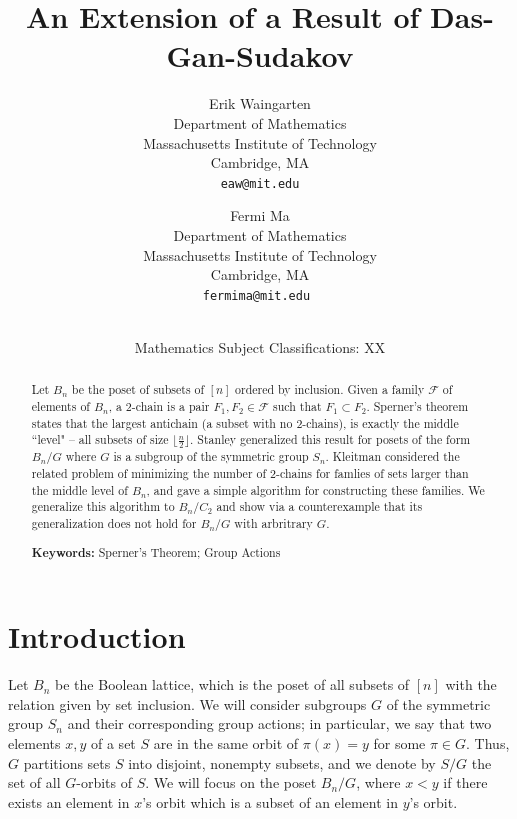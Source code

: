 \documentclass[12pt]{article}
\title{\bf An Extension of a Result of Das-Gan-Sudakov}
\author{Erik Waingarten\\
\small Department of Mathematics\\[-0.8ex]
\small Massachusetts Institute of Technology\\[-0.8ex] 
\small Cambridge, MA\\
\small\tt eaw@mit.edu\\
\and
Fermi Ma\\
\small Department of Mathematics\\[-0.8ex]
\small Massachusetts Institute of Technology\\[-0.8ex]
\small Cambridge, MA\\
\small\tt fermima@mit.edu
}
\date{\dateline{August, 2014}{XX}\\
\small Mathematics Subject Classifications: XX}
\theoremstyle{plain}
\theoremstyle{definition}
\theoremstyle{remark}
\newcommand{\F}{\mathcal{F}}
\begin{document}
\maketitle


\begin{abstract}
Let $B_n$ be the poset of subsets of $[n]$ ordered by inclusion. Given a family $\F$ of elements of $B_n$, a 2-chain is a pair $F_1, F_2 \in \F$ such that $F_1 \subset F_2$. Sperner's theorem states that the largest antichain (a subset with no 2-chains), is exactly the middle ``level" -- all subsets of size $\lfloor \frac{n}{2} \rfloor$. Stanley generalized this result for posets of the form $B_n/G$ where $G$ is a subgroup of the symmetric group $S_n$. Kleitman considered the related problem of minimizing the number of 2-chains for famlies of sets larger than the middle level of $B_n$, and gave a simple algorithm for constructing these families. We generalize this algorithm to $B_n/C_2$ and show via a counterexample that its generalization does not hold for $B_n/G$ with arbritrary $G$.

  \bigskip\noindent \textbf{Keywords:} Sperner's Theorem; Group Actions\end{abstract}

\section{Introduction}

Let $B_n$ be the Boolean lattice, which is the poset of all subsets of $[n]$ with the relation given by set inclusion. We will consider subgroups $G$ of the symmetric group $S_n$ and their corresponding group actions; in particular, we say that two elements $x, y$ of a set $S$ are in the same orbit of $\pi(x) = y$ for some $\pi \in G$. Thus, $G$ partitions sets $S$ into disjoint, nonempty subsets, and we denote by $S / G$ the set of all $G$-orbits of $S$. We will focus on the poset $B_n / G$, where $x < y$ if there exists an element in $x$'s orbit which is a subset of an element in $y$'s orbit.
\end{document}

